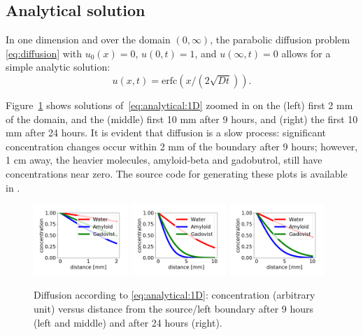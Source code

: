 \subsection{Analytical solution}
In one dimension and over the domain $(0, \infty)$, the parabolic
diffusion problem \eqref{eq:diffusion} with $u_0(x)=0$, $u(0, t) = 1$,
and $u(\infty, t) = 0$ allows for a simple analytic solution:
\begin{equation}
  \label{eq:analytical:1D}
  u(x,t) =  \mbox{erfc}(x / (2 \sqrt{D t})). 
\end{equation}

Figure~\ref{fig:chp6:analytics} shows solutions
of~\eqref{eq:analytical:1D} zoomed in on the (left) first 2 mm of the domain, 
and the (middle) first 10 mm after 9 hours, and (right) the first 10 mm after 24
hours. It is evident that diffusion is a slow process:
significant concentration changes occur within 2 mm of the boundary
after 9 hours; however, 1 cm away, the heavier molecules,
amyloid-beta and gadobutrol, still have concentrations near zero. The
source code for generating these plots is available in
.
\begin{figure}	
  \includegraphics[width=0.32\textwidth]{./graphics/chp6/9hours_2mm_WAG}
  \includegraphics[width=0.32\textwidth]{./graphics/chp6/9hours_1cm_WAG}
  \includegraphics[width=0.32\textwidth]{./graphics/chp6/24hours_1cm_WAG}
  \caption{Diffusion according to \eqref{eq:analytical:1D}:
    concentration (arbitrary unit) versus distance from the
    source/left boundary  after 9 hours (left and middle) and
    after 24 hours (right).}
  \label{fig:chp6:analytics}
\end{figure}

